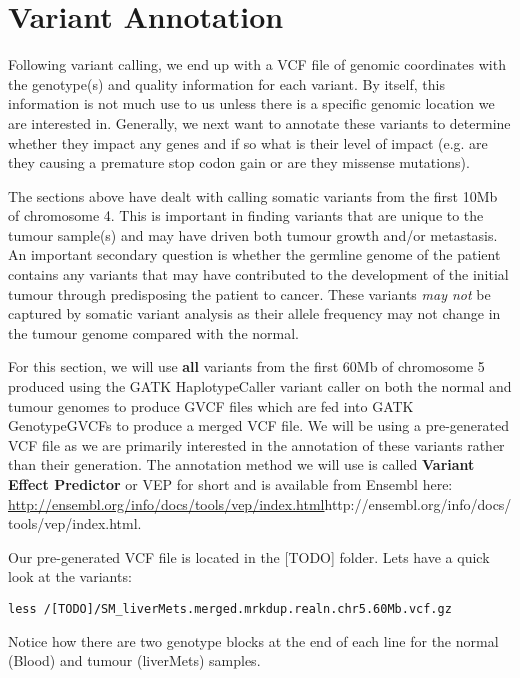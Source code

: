 \section{Variant Annotation}

Following variant calling, we end up with a VCF file of genomic coordinates with the genotype(s) and quality information for each variant. By itself, this information is not much use to us unless there is a specific genomic location we are interested in. Generally, we next want to annotate these variants to determine whether they impact any genes and if so what is their level of impact (e.g. are they causing a premature stop codon gain or are they missense mutations).

The sections above have dealt with calling somatic variants from the first 10Mb of chromosome 4. This is important in finding variants that are unique to the tumour sample(s) and may have driven both tumour growth and/or metastasis. An important secondary question is whether the germline genome of the patient contains any variants that may have contributed to the development of the initial tumour through predisposing the patient to cancer. These variants \textit{may not} be captured by somatic variant analysis as their allele frequency may not change in the tumour genome compared with the normal.

For this section, we will use \textbf{all} variants from the first 60Mb of chromosome 5 produced using the GATK HaplotypeCaller variant caller on both the normal and tumour genomes to produce GVCF files which are fed into GATK GenotypeGVCFs to produce a merged VCF file. We will be using a pre-generated VCF file as we are primarily interested in the annotation of these variants rather than their generation. The annotation method we will use is called \textbf{Variant Effect Predictor} or VEP for short and is available from Ensembl here: \url{http://ensembl.org/info/docs/tools/vep/index.html}{http://ensembl.org/info/docs/tools/vep/index.html}.

\begin{steps}
Our pre-generated VCF file is located in the [TODO] folder. Lets have a quick look at the variants:
\begin{lstlisting}
less /[TODO]/SM_liverMets.merged.mrkdup.realn.chr5.60Mb.vcf.gz
\end{lstlisting}
\end{steps}

Notice how there are two genotype blocks at the end of each line for the normal (Blood) and tumour (liverMets) samples.

